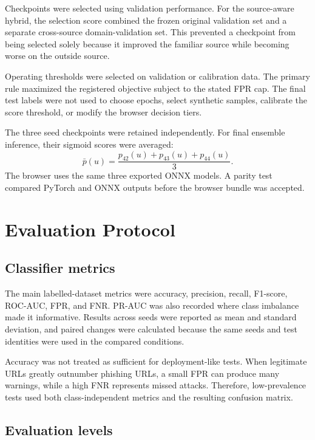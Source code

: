 Checkpoints were selected using validation performance. For the source-aware
hybrid, the selection score combined the frozen original validation set and a
separate cross-source domain-validation set. This prevented a checkpoint from
being selected solely because it improved the familiar source while becoming
worse on the outside source.

Operating thresholds were selected on validation or calibration data. The
primary rule maximized the registered objective subject to the stated FPR cap.
The final test labels were not used to choose epochs, select synthetic samples,
calibrate the score threshold, or modify the browser decision tiers.

The three seed checkpoints were retained independently. For final ensemble
inference, their sigmoid scores were averaged:
\begin{equation}
    \bar p(u)=\frac{p_{42}(u)+p_{43}(u)+p_{44}(u)}{3}.
    \label{eq:method-ensemble}
\end{equation}
The browser uses the same three exported ONNX models. A parity test compared
PyTorch and ONNX outputs before the browser bundle was accepted.

\section{Evaluation Protocol}

\subsection{Classifier metrics}

The main labelled-dataset metrics were accuracy, precision, recall, F1-score,
ROC-AUC, FPR, and FNR. PR-AUC was also recorded where class imbalance made it
informative. Results across seeds were reported as mean and standard deviation,
and paired changes were calculated because the same seeds and test identities
were used in the compared conditions.

Accuracy was not treated as sufficient for deployment-like tests. When
legitimate URLs greatly outnumber phishing URLs, a small FPR can produce many
warnings, while a high FNR represents missed attacks. Therefore, low-prevalence
tests used both class-independent metrics and the resulting confusion matrix.

\subsection{Evaluation levels}

